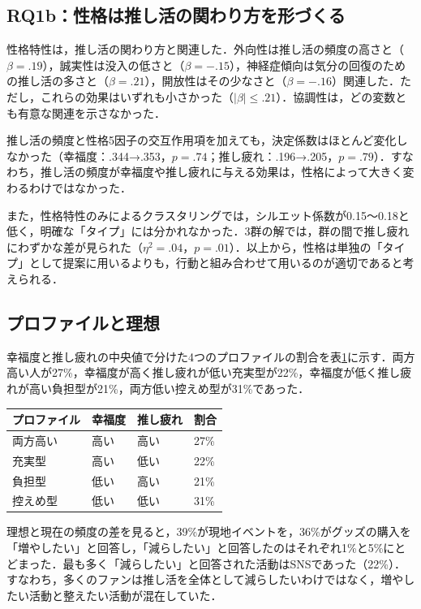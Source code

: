 \subsection{RQ1b：性格は推し活の関わり方を形づくる}
性格特性は，推し活の関わり方と関連した．外向性は推し活の頻度の高さと（$\beta=.19$），誠実性は没入の低さと（$\beta=-.15$），神経症傾向は気分の回復のための推し活の多さと（$\beta=.21$），開放性はその少なさと（$\beta=-.16$）関連した．ただし，これらの効果はいずれも小さかった（$|\beta|\leq.21$）．協調性は，どの変数とも有意な関連を示さなかった．

推し活の頻度と性格5因子の交互作用項を加えても，決定係数はほとんど変化しなかった（幸福度：.344→.353，$p=.74$；推し疲れ：.196→.205，$p=.79$）．すなわち，推し活の頻度が幸福度や推し疲れに与える効果は，性格によって大きく変わるわけではなかった．

また，性格特性のみによるクラスタリングでは，シルエット係数が0.15〜0.18と低く，明確な「タイプ」には分かれなかった．3群の解では，群の間で推し疲れにわずかな差が見られた（$\eta^2=.04$，$p=.01$）．以上から，性格は単独の「タイプ」として提案に用いるよりも，行動と組み合わせて用いるのが適切であると考えられる．

\subsection{プロファイルと理想}
幸福度と推し疲れの中央値で分けた4つのプロファイルの割合を表\ref{tab:profiles}に示す．両方高い人が27\%，幸福度が高く推し疲れが低い充実型が22\%，幸福度が低く推し疲れが高い負担型が21\%，両方低い控えめ型が31\%であった．

\begin{table}[t]
\centering
{}
\label{tab:profiles}
\small
\begin{tabular}{@{}llll@{}}
\toprule
プロファイル & 幸福度 & 推し疲れ & 割合 \\
\midrule
両方高い & 高い & 高い & 27\% \\
充実型 & 高い & 低い & 22\% \\
負担型 & 低い & 高い & 21\% \\
控えめ型 & 低い & 低い & 31\% \\
\bottomrule
\end{tabular}
\end{table}

理想と現在の頻度の差を見ると，39\%が現地イベントを，36\%がグッズの購入を「増やしたい」と回答し，「減らしたい」と回答したのはそれぞれ1\%と5\%にとどまった．最も多く「減らしたい」と回答された活動はSNSであった（22\%）．すなわち，多くのファンは推し活を全体として減らしたいわけではなく，増やしたい活動と整えたい活動が混在していた．

